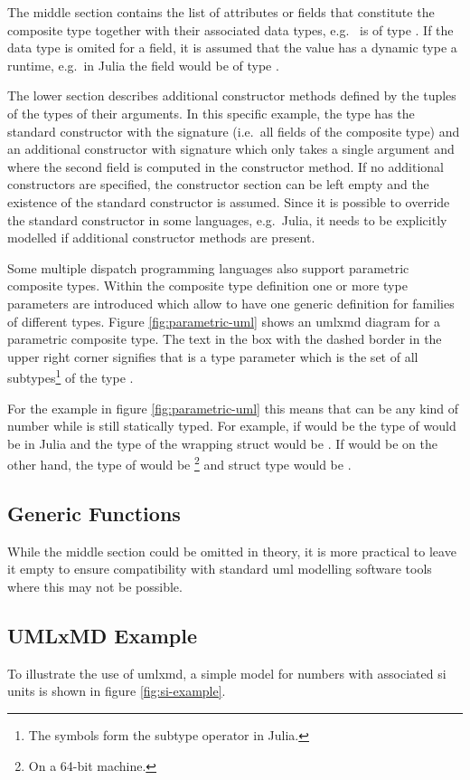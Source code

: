 The middle section contains the list of attributes or fields that constitute the composite type together with their associated data types, e.g.~ is of type .
If the data type is omited for a field, it is assumed that the value has a dynamic type a runtime, e.g.~in Julia the field would be of type .

The lower section describes additional constructor methods defined by the tuples of the types of their arguments.
In this specific example, the type  has the standard constructor with the signature  (i.e.~all fields of the composite type) and an additional constructor with signature  which only takes a single argument and where the second field is computed in the constructor method.
If no additional constructors are specified, the constructor section can be left empty and the existence of the standard constructor is assumed.
Since it is possible to override the standard constructor in some languages, e.g.~Julia, it needs to be explicitly modelled if additional constructor methods are present.

Some multiple dispatch programming languages also support parametric composite types.
Within the composite type definition one or more type parameters are introduced which allow to have one generic definition for families of different types.
Figure \ref{fig:parametric-uml} shows an \ac{umlxmd} diagram for a parametric composite type.
The text in the box with the dashed border in the upper right corner signifies that  is a type parameter which is the set of all subtypes\footnote{The symbols \code{<:} form the subtype operator in Julia.} of the type .

For the example in figure \ref{fig:parametric-uml} this means that  can be any kind of number while  is still statically typed.
For example, if  would be  the type of  would be  in Julia and the type of the wrapping  struct would be .
If  would be  on the other hand, the type of  would be \footnote{On a 64-bit machine.} and struct type would be .

\subsection{Generic Functions}
\label{sec:generic-functions}

While the middle section could be omitted in theory, it is more practical to leave it empty to ensure compatibility with standard \ac{uml} modelling software tools where this may not be possible.
\subsection{UMLxMD Example}
\label{sec:umlxmd-example}
To illustrate the use of \ac{umlxmd}, a simple model for numbers with associated \ac{si} units is shown in figure \ref{fig:si-example}.


